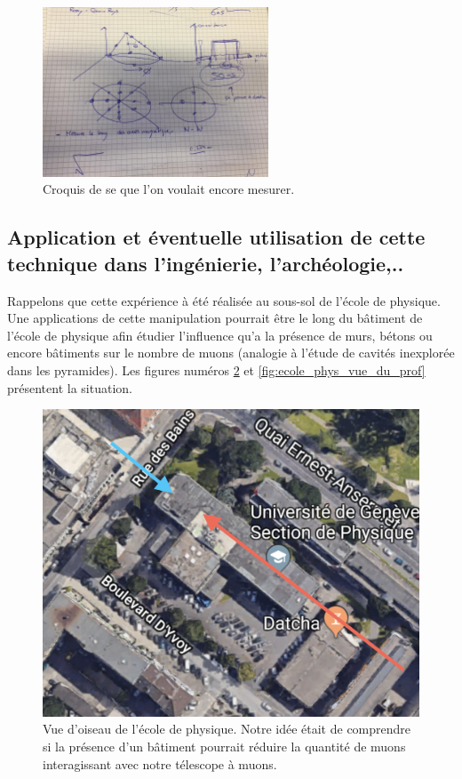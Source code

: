 \documentclass[12pt]{article}
\begin{document}
\begin{figure}[htpb!]
    \centering
    \includegraphics[width=0.6\textwidth]{Images/Schemas/Cone.jpeg}
    \captionsetup{width=0.7\textwidth}
    \caption{Croquis de se que l'on voulait encore mesurer.}
    \label{fig:cone}
\end{figure}


\subsection{Application et éventuelle utilisation de cette technique dans l'ingénierie, l'archéologie,.. }

Rappelons que cette expérience à été réalisée au sous-sol de l'école de physique. Une applications de cette manipulation pourrait être le long du bâtiment de l'école de physique afin étudier l'influence qu'a la présence de murs, bétons ou encore bâtiments sur le nombre de muons (analogie à l'étude de cavités inexplorée dans les pyramides). Les figures numéros \ref{fig:ecole_phys_vue_du_dessus} et \ref{fig:ecole_phys_vue_du_prof} présentent la situation.


\begin{figure}[htpb!]
    \centering
    \includegraphics[width=0.6\linewidth]{graphiques/experience2/gmap_ecole_phy_vue_dessus.png}
    \captionsetup{width=0.7\textwidth}
    \caption{Vue d'oiseau de l'école de physique. Notre idée était de comprendre si la présence d'un bâtiment pourrait réduire la quantité de muons interagissant avec notre télescope à muons. }
    \label{fig:ecole_phys_vue_du_dessus}
\end{figure}
\end{document}
